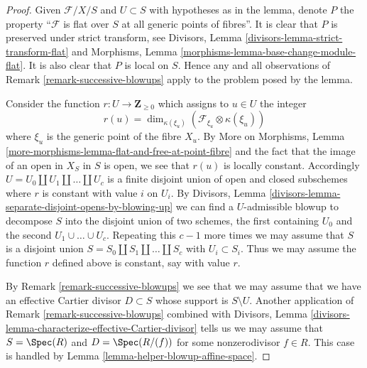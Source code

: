 \begin{proof}
Given $\mathcal{F}/X/S$ and $U \subset S$ with hypotheses as
in the lemma, denote $P$ the property ``$\mathcal{F}$ is flat over $S$ at
all generic points of fibres''. It is clear that $P$ is preserved under
strict transform, see
Divisors, Lemma \ref{divisors-lemma-strict-transform-flat}
and Morphisms, Lemma \ref{morphisms-lemma-base-change-module-flat}.
It is also clear that $P$ is local on $S$. Hence any and all observations
of Remark \ref{remark-successive-blowups} apply to the problem posed by
the lemma.

\medskip\noindent
Consider the function $r : U \to \mathbf{Z}_{\geq 0}$ which assigns to
$u \in U$ the integer
$$
r(u) = \dim_{\kappa(\xi_u)}(\mathcal{F}_{\xi_u} \otimes \kappa(\xi_u))
$$
where $\xi_u$ is the generic point of the fibre $X_u$.
By More on Morphisms, Lemma
\ref{more-morphisms-lemma-flat-and-free-at-point-fibre}
and the fact that the image of an open in $X_S$ in $S$ is open,
we see that $r(u)$ is locally constant. Accordingly
$U = U_0 \amalg U_1 \amalg \ldots \amalg U_c$ is a finite disjoint
union of open and closed subschemes where $r$ is constant with value
$i$ on $U_i$. By
Divisors, Lemma \ref{divisors-lemma-separate-disjoint-opens-by-blowing-up}
we can find a $U$-admissible blowup to decompose $S$ into
the disjoint union of two schemes, the first containing $U_0$ and
the second $U_1 \cup \ldots \cup U_c$. Repeating this $c - 1$
more times we may assume that $S$ is a disjoint union
$S = S_0 \amalg S_1 \amalg \ldots \amalg S_c$ with $U_i \subset S_i$.
Thus we may assume the function $r$ defined above is constant, say
with value $r$.

\medskip\noindent
By Remark \ref{remark-successive-blowups} we see that we may assume that
we have an effective Cartier divisor $D \subset S$ whose support is
$S \setminus U$. Another application of Remark \ref{remark-successive-blowups}
combined with
Divisors, Lemma \ref{divisors-lemma-characterize-effective-Cartier-divisor}
tells us we may assume that
$S = \Spec(R)$ and $D = \Spec(R/(f))$ for some nonzerodivisor
$f \in R$. This case is handled by
Lemma \ref{lemma-helper-blowup-affine-space}.
\end{proof}
